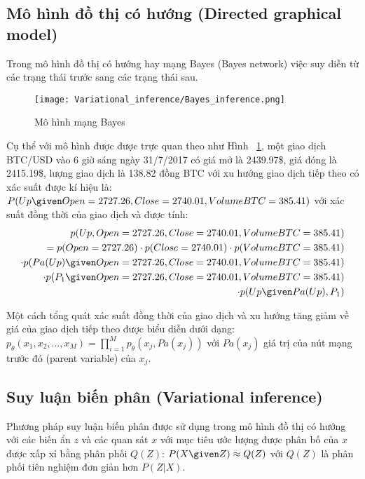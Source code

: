 \subsection{Mô hình đồ thị có hướng (Directed graphical model)}
Trong mô hình đồ thị có hướng hay mạng Bayes (Bayes network) việc suy diễn từ các trạng thái trước sang các trạng thái sau.
\begin{figure}[hbt!]
	\center	\texttt{[image: Variational\_inference/Bayes\_inference.png]}
	\caption{Mô hình mạng Bayes}
	\label{fig:Bayes_inference}
\end{figure}
Cụ thể với mô hình được được trực quan theo như Hình ~\ref{fig:Bayes_inference}, một giao dịch BTC/USD vào 6 giờ sáng ngày 31/7/2017 có giá mở là 2439.97\$, giá đóng là 2415.19\$, lượng giao dịch là 138.82 đồng BTC với xu hướng giao dịch tiếp theo có xác suất được kí hiệu là:
$P(Up \given Open =2727.26, Close=2740.01, Volume BTC = 385.41)$ với xác suất đồng thời của giao dịch và được tính:
\begin{equation}
\begin{split}
p(Up,Open = 2727.26, Close = 2740.01, Volume BTC = 385.41)\\
= p(Open = 2727.26) \cdot p(Close = 2740.01) \cdot p(Volume BTC = 385.41)\\
\cdot p(Pa(Up) \given Open =2727.26, Close=2740.01, Volume BTC = 385.41)\\
\cdot p(P_1 \given Open =2727.26, Close=2740.01, Volume BTC = 385.41)\\
\cdot p(Up \given Pa(Up), P_1)
\end{split}
\end{equation}



Một cách tổng quát xác suất đồng thời của giao dịch và xu hướng tăng giảm về giá của giao dịch tiếp theo được biểu diễn dưới dạng:
$p_\theta(x_1, x_2, \dots, x_M) = \prod_{i=1}^{M}p_\theta(x_j, Pa(x_j))$ với $Pa(x_j)$ giá trị của nút mạng trước đó (parent variable) của $x_j$.
\subsection{Suy luận biến phân (Variational inference)}
Phương pháp suy luận biến phân được sử dụng trong mô hình đồ thị có hướng\cite{intro_variational} với các biến ẩn $z$ và các quan sát $x$ với mục tiêu ước lượng được phân bố của $x$ được xấp xỉ bằng phân phối $Q(Z)$: $P(X \given Z) \approx Q(Z)$ với $Q(Z)$ là phân phối tiên nghiệm đơn giản hơn $P(Z|X)$.

